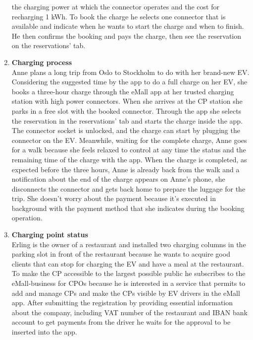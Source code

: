 \begin{enumerate}[label=\textbf{\Alph*}.]
            the charging power at which the connector operates and the cost for recharging 1 kWh.
            To book the charge he selects one connector that is available and indicate when he wants to start the charge
            and when to finish. He then confirms the booking and pays the charge, then see the reservation on the reservations' tab.
      \item \textbf{Charging process} \\
            Anne plans a long trip from Oslo to Stockholm to do with her brand-new EV.
            Considering the suggested time by the app to do a full charge on her EV, she books a three-hour charge through the eMall
            app at her trusted charging station with high power connectors.
            When she arrives at the CP station she parks in a free slot with the booked connector. Through the app she selects
            the reservation in the reservations' tab and starts the charge inside the app. The connector socket is unlocked, and
            the charge can start by plugging the connector on the EV. Meanwhile, waiting for the complete charge, Anne goes for a walk
            because she feels relaxed to control at any time the status and the remaining time of the charge with the app. When the charge
            is completed, as expected before the three hours, Anne is already back from the walk and a notification about the end of the charge
            appears on Anne's phone, she disconnects the connector and gets back home to prepare the luggage for the trip. She doesn't worry about
            the payment because it's executed in background with the payment method that she indicates during the booking operation.
      \item \textbf{Charging point status} \\
            Erling is the owner of a restaurant and installed two charging columns in the parking slot in front of the restaurant because
            he wants to acquire good clients that can stop for charging the EV and have a meal at the restaurant. To make the CP accessible to the largest
            possible public he subscribes to the eMall-business for CPOs because he is interested in a service that permits to add and manage CPs and make
            the CPs visible by EV drivers in the eMall app. After submitting the registration by providing essential information about the company, including
            VAT number of the restaurant and IBAN bank account to get payments from the driver he waits for the approval to be inserted into the app.

\end{enumerate}
